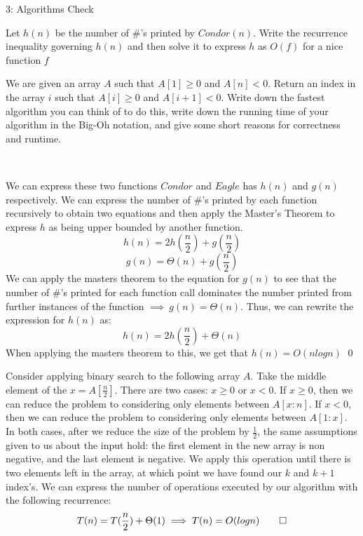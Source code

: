 \documentclass[12pt]{article}
\begin{document}
\begin{problem}{3: Algorithms Check}\
\begin{subprob}
    \item Let $h(n)$ be the number of $\#$'s printed by $Condor(n)$. Write the recurrence inequality governing $h(n)$ and then solve it to express $h$ as $O(f)$ for a nice function $f$
    \item We are given an array $A$ such that $A[1] \geq 0$ and $A[n] < 0$. Return an index in the array $i$ such that $A[i] \geq 0$ and $A[i+1] <0$. Write down the fastest algorithm you can think of to do this, write down the running time of your algorithm in the Big-Oh notation, and give some short reasons for correctness and runtime.
\end{subprob}
\end{problem}

\begin{solution}\
\begin{subprob}
    \item We can express these two functions $Condor$ and $Eagle$ has $h(n)$ and $g(n)$ respectively. We can express the number of  $\#$'s printed by each function recursively to obtain two equations and then apply the Master's Theorem to express $h$ as being upper bounded by another function.
    \[
    h(n) = 2h(\frac{n}{2}) + g(\frac{n}{2})
    \]
    \[
    g(n) = \Theta(n) + g(\frac{n}{2})
    \]
    We can apply the masters theorem to the equation for $g(n)$ to see that the number of  $\#$'s printed for each function call dominates the number printed from further instances of the function $\implies~g(n) = \Theta(n)$. Thus, we can rewrite the expression for $h(n)$ as:
    \[
    h(n) = 2h(\frac{n}{2}) + \Theta(n)
    \]
    When applying the masters theorem to this, we get that $h(n) = O(nlogn)$ \qed
    \item Consider applying binary search to the following array $A$. Take the middle element of the $x = A[\frac{n}{2}]$. There are two cases: $x \geq 0$ or $x < 0$. If $x \geq 0$, then we can reduce the problem to considering only elements between $A[x:n]$. If $x < 0$, then we can reduce the problem to considering only elements between $A[1:x]$. In both cases, after we reduce the size of the problem by $\frac{1}{2}$, the same assumptions given to us about the input hold: the first element in the new array is non negative, and the last element is negative. We apply this operation until there is two elements left in the array, at which point we have found our $k$ and $k+1$ index's. We can express the number of operations executed by our algorithm with the following recurrence:
    \[
    T(n) = T(\frac{n}{2}) + \Theta(1) \implies T(n) = O(logn) \qed
    \]
\end{subprob}
\end{solution}
\clearpage
\end{document}
